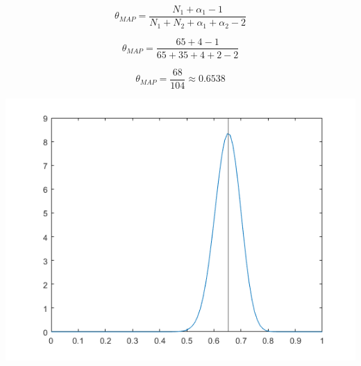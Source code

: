 \documentclass[a4paper]{article}
\begin{document}
\[ \theta_{MAP} = \frac{N_1+\alpha_1-1}{N_1+N_2+\alpha_1+\alpha_2-2} \]

\[ \theta_{MAP} =\frac{65+4-1}{65+35+4+2-2} \]

\[ \theta_{MAP} =\frac{68}{104}\approx 0.6538 \]

\begin{center}
    \includegraphics[scale=1]{6-d-posterior.png}
    \caption{$\theta_{map}\approx 0.6538$} 
\end{center}
\end{document}
